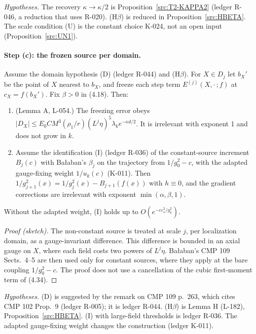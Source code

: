 \emph{Hypotheses.} The recovery $\kappa\to\kappa/2$ is Proposition~\ref{src:T2-KAPPA2} (ledger R-046, a reduction that uses R-020). (H$\beta$) is reduced in Proposition~\ref{src:HBETA}. The scale condition (U) is the constant choice K-024, not an open input (Proposition~\ref{src:UN1}).

\paragraph{Step (c): the frozen source per domain.}

\begin{proposition}\label{src:D2C}
Assume the domain hypothesis (D) (ledger R-044) and (H$\beta$). For $X\in D_j$ let $b_X'$ be the point of $X$ nearest to $b_X$, and freeze each step term $E^{(j)}(X,\cdot\,;f)$ at $c_X=f(b_X')$. Fix $\beta>0$ in (4.18). Then:
\begin{enumerate}
\item[(i)] (Lemma A, L-054.) The freezing error obeys $|D_X|\le E_0CM^3(\rho_1/r)(L^j\eta)^5\lambda_ke^{-\kappa d/2}$. It is irrelevant with exponent 1 and does not grow in $k$.
\item[(ii)] Assume the identification (I) (ledger R-036) of the constant-source increment $B_j(c)$ with Ba{\l}aban's $\beta_j$ on the trajectory from $1/g_0^2-c$, with the adapted gauge-fixing weight $1/u_k(c)$ (K-011). Then $1/g_{j+1}^2(x)=1/g_j^2(x)-B_{j+1}(f(x))$ with $h\equiv0$, and the gradient corrections are irrelevant with exponent $\min(\alpha,\beta,1)$.
\end{enumerate}
Without the adapted weight, (I) holds up to $O(e^{-c\varepsilon_1^2/g_k^2})$.
\end{proposition}

\begin{proof}[Proof (sketch)]
The non-constant source is treated at scale $j$, per localization domain, as a gauge-invariant difference. This difference is bounded in an axial gauge on $X$, where each field costs two powers of $L^j\eta$. Ba{\l}aban's CMP 109 Sects.~4--5 are then used only for constant sources, where they apply at the bare coupling $1/g_0^2-c$. The proof does not use a cancellation of the cubic first-moment term of (4.34).
\end{proof}

\emph{Hypotheses.} (D) is suggested by the remark on CMP 109 p.~263, which cites CMP 102 Prop.~9 (ledger R-005); it is ledger R-044. (H$\beta$) is Lemma H (L-182), Proposition~\ref{src:HBETA}. (I) with large-field thresholds is ledger R-036. The adapted gauge-fixing weight changes the construction (ledger K-011).

